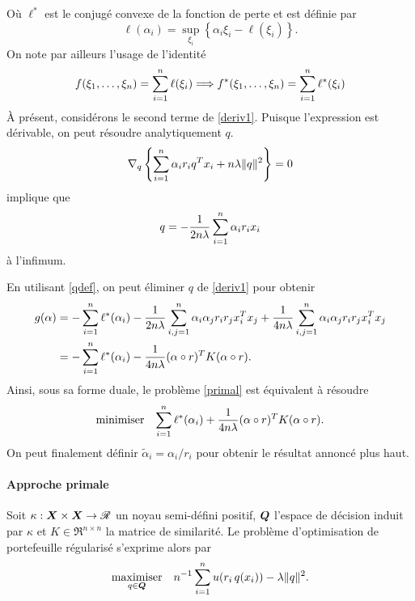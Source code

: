 Où $\ell^*$ est le conjugé convexe de la fonction de perte et est définie par 
\begin{equation}
  \label{k:eqconvconj}
  \ell(\alpha_i) = \sup_{\xi_i}\left\{\alpha_i\xi_i - \ell(\xi_i)\right\}.
\end{equation}
On note par ailleurs l'usage de l'identité
\begin{equation}
  \label{lemma1}
  f(\xi_1,\dots,\xi_n) = \sumi \ell(\xi_i) \Longrightarrow f^*(\xi_1,\dots,\xi_n) = \sumi \ell^*(\xi_i)
\end{equation}
À présent, considérons le second terme de  \eqref{deriv1}. Puisque l'expression est
dérivable, on peut résoudre analytiquement $q$.
\begin{equation}
  \nabla_q \left\{\sum_{i=1}^n \alpha_ir_iq^Tx_i + n\lambda\|q\|^2\right\} = 0
\end{equation}
implique que
\begin{equation}
 q = -\frac{1}{2n\lambda}\sum_{i=1}^n \alpha_ir_ix_i \label{qdef}
\end{equation}
à l'infimum.

En utilisant \eqref{qdef}, on peut éliminer $q$ de \eqref{deriv1} pour obtenir
\begin{align}
  g(\alpha) &= -\sum_{i=1}^n \ell^*(\alpha_i) - \frac{1}{2n\lambda}\sum_{i,j=1}^n \alpha_i\alpha_jr_ir_jx_i^Tx_j + \frac{1}{4n\lambda}
         \sum_{i,j=1}^n \alpha_i\alpha_jr_ir_jx_i^Tx_j\\
       &= -\sum_{i=1}^n \ell^*(\alpha_i) - \frac{1}{4n\lambda}(\alpha \circ r)^TK(\alpha \circ r). 
\end{align}
Ainsi, sous sa forme duale, le problème \eqref{primal} est équivalent à résoudre
\begin{equation}
  \label{dual}
  \minimizeEquation{\sumi \ell^*(\alpha_i) + \frac{1}{4n\lambda}(\alpha \circ r)^TK(\alpha \circ r).}
\end{equation}
On peut finalement définir $\tilde\alpha_i = \alpha_i/r_i$ pour obtenir le résultat annoncé plus haut.


\paragraph{Approche primale}


Soit $\kappa: \bm{X} \times \bm{X} \to \mathscr{R}$ un noyau semi-défini positif, $\bm Q$ l'espace de décision induit par
$\kappa$ et $K \in \Re^{n \times n}$ la matrice de similarité. Le problème d'optimisation de
portefeuille régularisé s'exprime alors par
\begin{equation}
  \label{k:basic}
  \maximizeEquation[q \in \Q]{n^{-1}\sumi u(r_i\,q(x_i)) - \lambda\nq{q}^2.}
\end{equation}

